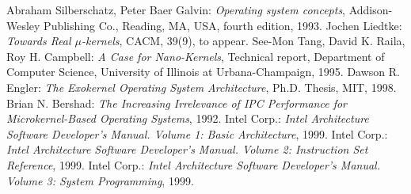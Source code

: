 \documentclass[12pt, letterpaper, oneside, english]{article}
\begin{document}
\begin{thebibliography}{99}
 Abraham Silberschatz, Peter Baer Galvin: \emph{Operating system concepts}, Addison-Wesley Publishing Co., Reading, MA, USA, fourth edition, 1993.
 Jochen Liedtke: \emph{Towards Real $\mu$-kernels}, CACM, 39(9), to appear.
 See-Mon Tang, David K. Raila, Roy H. Campbell: \emph{A Case for Nano-Kernels}, Technical report, Department of Computer Science, University of Illinois at Urbana-Champaign, 1995.
 Dawson R. Engler: \emph{The Exokernel Operating System Architecture}, Ph.D. Thesis, MIT, 1998.
 Brian N. Bershad: \emph{The Increasing Irrelevance of IPC Performance for Microkernel-Based Operating Systems}, 1992.
 Intel Corp.: \emph{Intel Architecture Software Developer's Manual. Volume 1: Basic Architecture}, 1999.
 Intel Corp.: \emph{Intel Architecture Software Developer's Manual. Volume 2: Instruction Set Reference}, 1999.
 Intel Corp.: \emph{Intel Architecture Software Developer's Manual. Volume 3: System Programming}, 1999.
\end{thebibliography}
\end{document}
